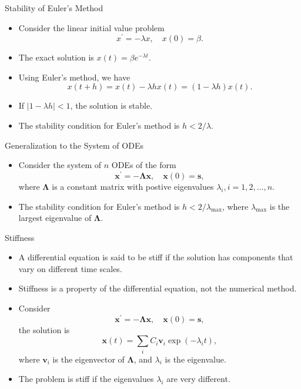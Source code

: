 \documentclass{beamer}
\begin{document}
\begin{frame}{Stability of Euler's Method}
    \begin{itemize}
        \item Consider the linear initial value problem
        \[
            x^{\prime}=-\lambda x, \quad x(0)=\beta.
            \]
            \item The exact solution is $x(t)=\beta e^{-\lambda t}$.
            \item Using Euler's method, we have
            \[ 
            x(t+h)=x(t)-\lambda h x(t)=(1-\lambda h)x(t).
            \]
            \item If $|1-\lambda h|<1$, the solution is stable. 
            \item The stability condition for Euler's method is $h<2/\lambda$.

    \end{itemize}

\end{frame}
\begin{frame}{Generalization to the System of ODEs}
    \begin{itemize}
         \item Consider the system of $n$ ODEs of the form
        \[
        \mathbf{x}^{\prime}=-\boldsymbol{\Lambda} \mathbf{x}, \quad \mathbf{x}(0)=\mathbf{s}, 
        \]
        where $\boldsymbol{\Lambda}$ is a constant matrix with postive eigenvalues $\lambda_i, i=1,2,\ldots,n$.
        \item The stability condition for Euler's method is $h<2/\lambda_{\max}$, where $\lambda_{\max}$ is the largest eigenvalue of $\boldsymbol{\Lambda}$.
    \end{itemize}
\end{frame}
\begin{frame}{Stiffness}
    \begin{itemize}
        \item A differential equation is said to be stiff if the solution has components that vary on different time scales.
        \item Stiffness is a property of the differential equation, not the numerical method.
        \item Consider 
        \[
        \mathbf{x}^{\prime}=-\boldsymbol{\Lambda} \mathbf{x}, \quad \mathbf{x}(0)=\mathbf{s}, 
        \]
        the solution is
        \[
        \mathbf{x}(t)=\sum_i C_i \mathbf{v}_i \exp \left(-\lambda_i t\right),
        \]
        where $\mathbf{v}_i$ is the eigenvector of $\boldsymbol{\Lambda}$, and $\lambda_i$ is the eigenvalue.
        \item The problem is stiff if the eigenvalues $\lambda_i$ are very different.
    \end{itemize}
\end{frame}
\end{document}
